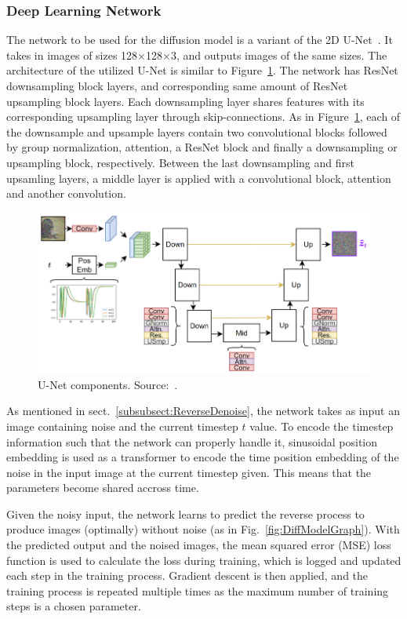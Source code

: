 \documentclass[fullpaper]{nldl}
\begin{document}
\subsubsection{Deep Learning Network}
\label{subsubsect:Network}
The network to be used for the diffusion model is a variant of the 2D U-Net~\cite{ronneberger2015u}. It takes in images of sizes 128$\times$128$\times$3, and outputs images of the same sizes. The architecture of the utilized U-Net is similar to Figure~\ref{fig:UNet}. The network has ResNet downsampling block layers, and corresponding same amount of ResNet upsampling block layers. Each downsampling layer shares features with its corresponding upsampling layer through skip-connections. As in Figure~\ref{fig:UNet}, each of the downsample and upsample layers contain two convolutional blocks followed by group normalization, attention, a ResNet block and finally a downsampling or upsampling block, respectively. Between the last downsampling and first upsamling layers, a middle layer is applied with a convolutional block, attention and another convolution.

\begin{figure}[h!]
	\centering
	\includegraphics[width=1\linewidth]{UNet.png}
	\caption{U-Net components. Source:~\cite{bianchi2024DDPMtutorial}. \label{fig:UNet}}
\end{figure}

As mentioned in sect.~\ref{subsubsect:ReverseDenoise}, the network takes as input an image containing noise and the current timestep $t$ value. To encode the timestep information such that the network can properly handle it, sinusoidal position embedding is used as a transformer to encode the time position embedding of the noise in the input image at the current timestep given. This means that the parameters become shared accross time.

Given the noisy input, the network learns to predict the reverse process to produce images (optimally) without noise (as in Fig.~\ref{fig:DiffModelGraph}). With the predicted output and the noised images, the mean squared error (MSE) loss function is used to calculate the loss during training, which is logged and updated each step in the training process. Gradient descent is then applied, and the training process is repeated multiple times as the maximum number of training steps is a chosen parameter.
\end{document}
